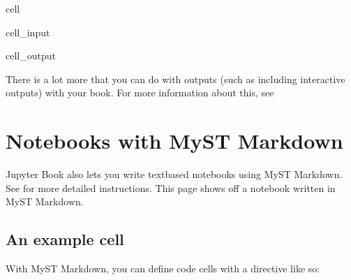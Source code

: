 \documentclass[letterpaper,10pt,english]{jupyterBook}
\begin{document}
\begin{sphinxuseclass}{cell}
\begin{sphinxVerbatimInput}
\begin{sphinxuseclass}{cell_input}
\begin{sphinxVerbatim}[commandchars=\\\{\}]
    
  
 \PYG{p}{[}  \PYG{p}{]}
\end{sphinxVerbatim}

\end{sphinxuseclass}\end{sphinxVerbatimInput}
\begin{sphinxVerbatimOutput}

\begin{sphinxuseclass}{cell_output}
\noindent{}

\end{sphinxuseclass}\end{sphinxVerbatimOutput}

\end{sphinxuseclass}
\sphinxAtStartPar
There is a lot more that you can do with outputs (such as including interactive outputs)
with your book. For more information about this, see 

\sphinxstepscope


\chapter{Notebooks with MyST Markdown}
\label{\detokenize{markdown-notebooks:notebooks-with-myst-markdown}}\label{\detokenize{markdown-notebooks::doc}}
\sphinxAtStartPar
Jupyter Book also lets you write text\sphinxhyphen{}based notebooks using MyST Markdown.
See  for more detailed instructions.
This page shows off a notebook written in MyST Markdown.


\section{An example cell}
\label{\detokenize{markdown-notebooks:an-example-cell}}
\sphinxAtStartPar
With MyST Markdown, you can define code cells with a directive like so:
\end{document}
